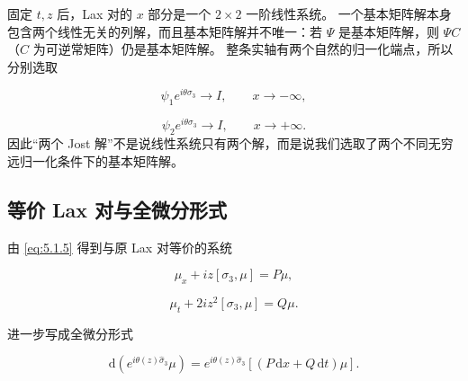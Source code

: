 \documentclass[
    lang=cn,
    scheme=chinese,
    mode=simple,
    device=normal,
    color=blue,
    math=cm,
    thmcnt=section,
    12pt,
    nowatermark
]{elegantbook}
\begin{document}
\begin{callout}
    固定 $t,z$ 后，Lax 对的 $x$ 部分是一个 $2\times2$ 一阶线性系统。
    一个基本矩阵解本身包含两个线性无关的列解，而且基本矩阵解并不唯一：若 $\Psi$ 是基本矩阵解，则 $\Psi C$（$C$ 为可逆常矩阵）仍是基本矩阵解。
    整条实轴有两个自然的归一化端点，所以分别选取

    \[
        \psi_1e^{i\theta\sigma_3}\to I,\qquad x\to-\infty,
    \]

    \[
        \psi_2e^{i\theta\sigma_3}\to I,\qquad x\to+\infty.
    \]
    因此``两个 Jost 解''不是说线性系统只有两个解，而是说我们选取了两个不同无穷远归一化条件下的基本矩阵解。
\end{callout}

\subsection{等价 Lax 对与全微分形式}

由 \eqref{eq:5.1.5} 得到与原 Lax 对等价的系统

\begin{equation}
    \mu_x+iz[\sigma_3,\mu]=P\mu,
    \tag{5.1.7}
    \label{eq:5.1.7}
\end{equation}

\begin{equation}
    \mu_t+2iz^2[\sigma_3,\mu]=Q\mu.
    \tag{5.1.8}
    \label{eq:5.1.8}
\end{equation}

进一步写成全微分形式

\begin{equation}
    \mathrm d\!\left(e^{i\theta(z)\widehat{\sigma}_3}\mu\right)
    =
    e^{i\theta(z)\widehat{\sigma}_3}
    \left[(P\,\mathrm dx+Q\,\mathrm dt)\mu\right].
    \tag{5.1.9}
    \label{eq:5.1.9}
\end{equation}
\end{document}
